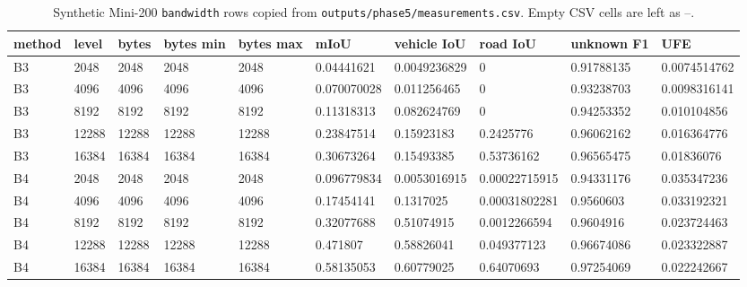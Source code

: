 \begin{table}[t]
\centering
\caption{Synthetic Mini-200 \texttt{bandwidth} rows copied from \texttt{outputs/phase5/measurements.csv}. Empty CSV cells are left as --.}
\label{tab:bandwidth}
\scriptsize
\setlength{\tabcolsep}{3pt}
\begin{tabular}{llllllllll}
\toprule
method & level & bytes & bytes min & bytes max & mIoU & vehicle IoU & road IoU & unknown F1 & UFE \\
\midrule
B3 & 2048 & 2048 & 2048 & 2048 & 0.04441621 & 0.0049236829 & 0 & 0.91788135 & 0.0074514762 \\
B3 & 4096 & 4096 & 4096 & 4096 & 0.070070028 & 0.011256465 & 0 & 0.93238703 & 0.0098316141 \\
B3 & 8192 & 8192 & 8192 & 8192 & 0.11318313 & 0.082624769 & 0 & 0.94253352 & 0.010104856 \\
B3 & 12288 & 12288 & 12288 & 12288 & 0.23847514 & 0.15923183 & 0.2425776 & 0.96062162 & 0.016364776 \\
B3 & 16384 & 16384 & 16384 & 16384 & 0.30673264 & 0.15493385 & 0.53736162 & 0.96565475 & 0.01836076 \\
B4 & 2048 & 2048 & 2048 & 2048 & 0.096779834 & 0.0053016915 & 0.00022715915 & 0.94331176 & 0.035347236 \\
B4 & 4096 & 4096 & 4096 & 4096 & 0.17454141 & 0.1317025 & 0.00031802281 & 0.9560603 & 0.033192321 \\
B4 & 8192 & 8192 & 8192 & 8192 & 0.32077688 & 0.51074915 & 0.0012266594 & 0.9604916 & 0.023724463 \\
B4 & 12288 & 12288 & 12288 & 12288 & 0.471807 & 0.58826041 & 0.049377123 & 0.96674086 & 0.023322887 \\
B4 & 16384 & 16384 & 16384 & 16384 & 0.58135053 & 0.60779025 & 0.64070693 & 0.97254069 & 0.022242667 \\
\bottomrule
\end{tabular}
\end{table}
